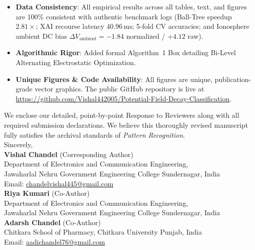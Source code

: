 \documentclass[11pt]{article}
\begin{document}
\begin{enumerate}
\begin{itemize}
        \item \textbf{Data Consistency}: All empirical results across all tables, text, and figures are 100\% consistent with authentic benchmark logs (Ball-Tree speedup $2.81\times$; XAI recourse latency $40.96\,\mathrm{ms}$; 5-fold CV accuracies; and Ionosphere ambient DC bias $\Delta V_{\mathrm{ambient}} = -1.84$ normalized / $+4.12$ raw).
        \item \textbf{Algorithmic Rigor}: Added formal Algorithm~1 Box detailing Bi-Level Alternating Electrostatic Optimization.
        \item \textbf{Unique Figures \& Code Availability}: All figures are unique, publication-grade vector graphics. The public GitHub repository is live at \url{https://github.com/Vishal442005/Potential-Field-Decay-Classification}.
    \end{itemize}
\end{enumerate}
We enclose our detailed, point-by-point Response to Reviewers along with all required submission declarations. We believe this thoroughly revised manuscript fully satisfies the archival standards of \textit{Pattern Recognition}.\\[1em]
Sincerely,\\[1em]
\textbf{Vishal Chandel} (Corresponding Author)\\
Department of Electronics and Communication Engineering,\\
Jawaharlal Nehru Government Engineering College Sundernagar, India\\
Email: \href{mailto:chandelvishal445@gmail.com}{chandelvishal445@gmail.com}\\[0.5em]
\textbf{Riya Kumari} (Co-Author)\\
Department of Electronics and Communication Engineering,\\
Jawaharlal Nehru Government Engineering College Sundernagar, India\\[0.5em]
\textbf{Adarsh Chandel} (Co-Author)\\
Chitkara School of Pharmacy, Chitkara University Punjab, India\\
Email: \href{mailto:aadichandel76@gmail.com}{aadichandel76@gmail.com}
\end{document}
